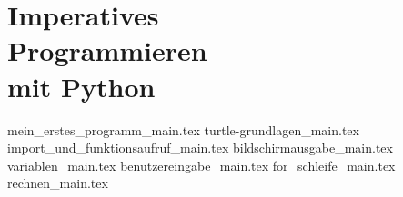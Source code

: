 
\part[Imperatives Programmieren mit Python]{Imperatives \\ Programmieren \\ mit Python}
\label{part-programmieren-mit-python}

{mein_erstes_programm_main.tex}
{turtle-grundlagen_main.tex}
{import_und_funktionsaufruf_main.tex}
{bildschirmausgabe_main.tex}
{variablen_main.tex}
{benutzereingabe_main.tex}
{for_schleife_main.tex}
{rechnen_main.tex}

